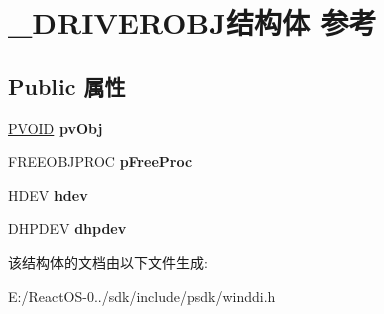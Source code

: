 \hypertarget{struct___d_r_i_v_e_r_o_b_j}{}\section{\+\_\+\+D\+R\+I\+V\+E\+R\+O\+B\+J结构体 参考}
\label{struct___d_r_i_v_e_r_o_b_j}
\subsection*{Public 属性}
\begin{DoxyCompactItemize}
\item 
\mbox{\label{struct___d_r_i_v_e_r_o_b_j_a00e4dbe14810e62fe50b1597176deaee}} 
\hyperlink{interfacevoid}{P\+V\+O\+ID} {\bfseries pv\+Obj}
\item 
\mbox{\label{struct___d_r_i_v_e_r_o_b_j_a9d9c79098ded5c4bab4745e1aff89293}} 
F\+R\+E\+E\+O\+B\+J\+P\+R\+OC {\bfseries p\+Free\+Proc}
\item 
\mbox{\label{struct___d_r_i_v_e_r_o_b_j_a7d03ad0357de3bda6c8ede21a17def70}} 
H\+D\+EV {\bfseries hdev}
\item 
\mbox{\label{struct___d_r_i_v_e_r_o_b_j_ababddeffb334f6c7e02ba6ce2d71923f}} 
D\+H\+P\+D\+EV {\bfseries dhpdev}
\end{DoxyCompactItemize}


该结构体的文档由以下文件生成\+:\begin{DoxyCompactItemize}
\item 
E\+:/\+React\+O\+S-\/0../sdk/include/psdk/winddi.\+h\end{DoxyCompactItemize}
